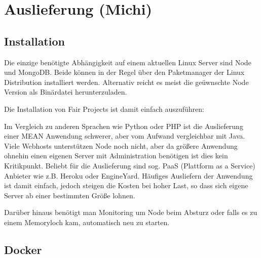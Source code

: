 \chapter{Auslieferung (Michi)}\label{auslieferung-michi}

\section{Installation}\label{installation}

Die einzige benötigte Abhängigkeit auf einem aktuellen Linux Server sind
Node und MongoDB. Beide können in der Regel über den Paketmanager der
Linux Distribution installiert werden. Alternativ reicht es meist die
geüwnschte Node Version als Binärdatei herunterzuladen.

Die Installation von Fair Projects ist damit einfach auszuführen:

\begin{Shaded}
\begin{Highlighting}[]
 
 

 

 

 
\end{Highlighting}
\end{Shaded}

Im Vergleich zu anderen Sprachen wie Python oder PHP ist die
Auslieferung einer MEAN Anwendung schwerer, aber vom Aufwand
vergleichbar mit Java. Viele Webhosts unterstützen Node noch nicht, aber
da größere Anwendung ohnehin einen eigenen Server mit Administration
benötigen ist dies kein Kritikpunkt. Beliebt für die Auslieferung sind
sog. PaaS (Plattform as a Service) Anbieter wie z.B. Heroku oder
EngineYard. Häufiges Ausliefern der Anwendung ist damit einfach, jedoch
steigen die Kosten bei hoher Last, so dass sich eigene Server ab einer
bestimmten Größe lohnen.

Darüber hinaus benötigt man Monitoring um Node beim Absturz oder falls
es zu einem Memoryloch kam, automatisch neu zu starten.

\section{Docker}\label{docker}


